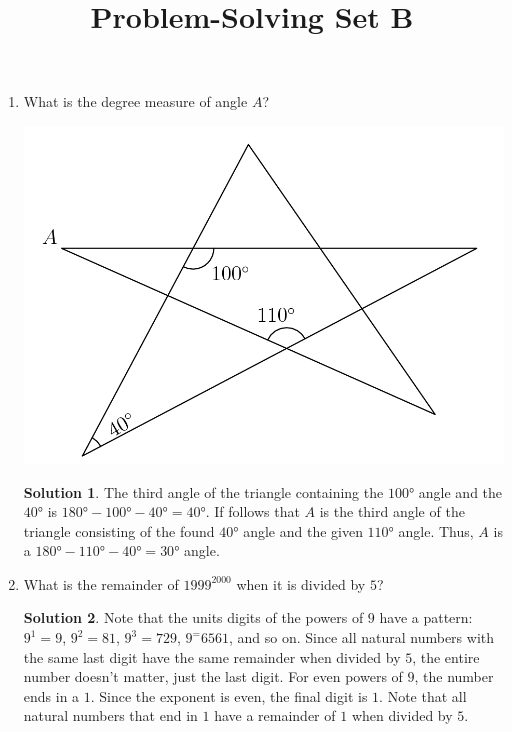 \documentclass{article}
\title{Problem-Solving Set B}
\author{}
\date{}
\theoremstyle{definition}
\newtheorem*{solution}{Solution}
\begin{document}
\maketitle
\begin{multicols}{2}
    \begin{enumerate}
        \item What is the degree measure of angle $A$?
            \begin{center}
                \includegraphics[scale=0.15]{star.png}
            \end{center}
            \begin{solution}
                The third angle of the triangle containing the $\ang{100}$ angle and the $\ang{40}$ is $\ang{180} - \ang{100} - \ang{40} = \ang{40}$.
                If follows that $A$ is the third angle of the triangle consisting of the found $\ang{40}$ angle and the given $\ang{110}$ angle.
                Thus, $A$ is a $\ang{180} - \ang{110} - \ang{40} = \ang{30}$ angle.
            \end{solution}
        \item What is the remainder of $1999^{2000}$ when it is divided by $5$?
            \begin{solution}
                Note that the units digits of the powers of $9$ have a pattern: $9^1 = 9$, $9^2 = 81$, $9^3 = 729$, $9^ = 6561$, and so on.
                Since all natural numbers with the same last digit have the same remainder when divided by $5$, the entire number doesn't matter, just the last digit.
                For even powers of $9$, the number ends in a $1$.
                Since the exponent is even, the final digit is $1$.
                Note that all natural numbers that end in $1$ have a remainder of $1$ when divided by $5$.

\end{solution}
\end{enumerate}
\end{multicols}
\end{document}

